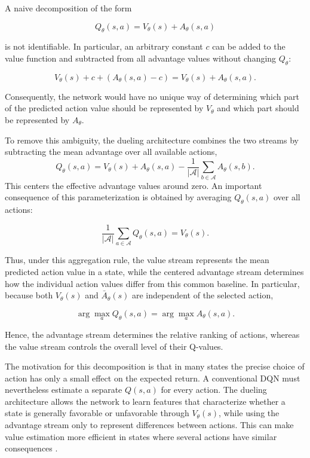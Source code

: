 \documentclass[11pt,a4paper]{article}
\begin{document}
A naive decomposition of the form

$$
Q_\theta(s,a)=V_\theta(s)+A_\theta(s,a)
$$

is not identifiable. In particular, an arbitrary constant \(c\) can be added to the value function and subtracted from all advantage values without changing \(Q_\theta\):

$$
V_\theta(s)+c
+
\left(A_\theta(s,a)-c\right)
=
V_\theta(s)+A_\theta(s,a).
$$

Consequently, the network would have no unique way of determining which part of the predicted action value should be represented by \(V_\theta\) and which part should be represented by \(A_\theta\).

To remove this ambiguity, the dueling architecture combines the two streams by subtracting the mean advantage over all available actions,
\begin{equation}
Q_\theta(s,a)=V_\theta(s)+A_\theta(s,a)
-\frac{1}{|\mathcal{A}|}\sum_{b\in\mathcal{A}}A_\theta(s,b).
\label{eq:dueling}
\end{equation}
This centers the effective advantage values around zero. 
An important consequence of this parameterization is obtained by averaging \(Q_\theta(s,a)\) over all actions:

$$
\frac{1}{|\mathcal A|}
\sum_{a\in\mathcal A}Q_\theta(s,a)
=
V_\theta(s).
$$

Thus, under this aggregation rule, the value stream represents the mean predicted action value in a state, while the centered advantage stream determines how the individual action values differ from this common baseline. In particular, because both \(V_\theta(s)\) and \(\bar A_\theta(s)\) are independent of the selected action,

$$
\arg\max_{a} Q_\theta(s,a)
=
\arg\max_{a} A_\theta(s,a).
$$

Hence, the advantage stream determines the relative ranking of actions, whereas the value stream controls the overall level of their Q-values.

The motivation for this decomposition is that in many states the precise choice of action has only a small effect on the expected return. A conventional DQN must nevertheless estimate a separate \(Q(s,a)\) for every action. The dueling architecture allows the network to learn features that characterize whether a state is generally favorable or unfavorable through \(V_\theta(s)\), while using the advantage stream only to represent differences between actions. This can make value estimation more efficient in states where several actions have similar consequences \citep{wang2016dueling}.
\end{document}
